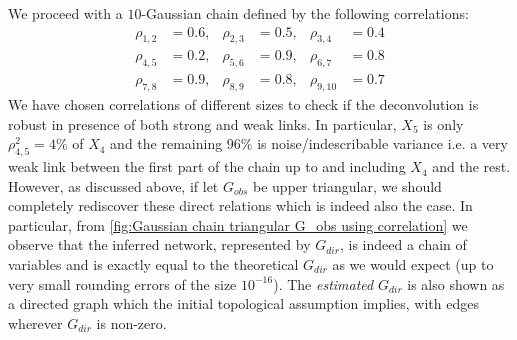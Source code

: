 \documentclass[../Thesis.tex]{subfiles}
\begin{document}
We proceed with a $10$-Gaussian chain defined by the following correlations:
\begin{equation}\label{eq:Example Gaussian chain}
    \begin{aligned}
        \rho_{1,2} & = 0.6, & \rho_{2,3} & = 0.5, & \rho_{3,4}  & = 0.4 \\
        \rho_{4,5} & = 0.2, & \rho_{5,6} & = 0.9, & \rho_{6,7}  & = 0.8 \\
        \rho_{7,8} & = 0.9, & \rho_{8,9} & = 0.8, & \rho_{9,10} & = 0.7
    \end{aligned}
\end{equation}
We have chosen correlations of different sizes to check if the deconvolution is robust in presence of both strong and weak links. In particular, $X_5$ is only $\rho_{4,5}^2 = 4\%$ of $X_4$ and the remaining $96\%$ is noise/indescribable variance i.e. a very weak link between the first part of the chain up to and including $X_4$ and the rest. However, as discussed above, if let $G_{obs}$ be upper triangular, we should completely rediscover these direct relations which is indeed also the case. In particular, from \autoref{fig:Gaussian chain triangular G_obs using correlation} we observe that the inferred network, represented by $G_{dir}$, is indeed a chain of variables and is exactly equal to the theoretical $G_{dir}$ as we would expect (up to very small rounding errors of the size $10^{-16}$). The \textit{estimated} $G_{dir}$ is also shown as a directed graph which the initial topological assumption implies, with edges wherever $G_{dir}$ is non-zero.
\end{document}
